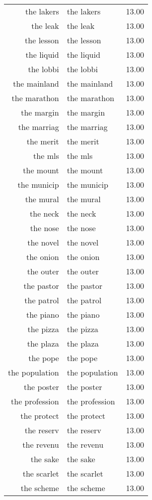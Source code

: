 \begin{table}[ht]
\begin{tabular}{rlr}
  the lakers & the lakers & 13.00 \\ 
  the leak & the leak & 13.00 \\ 
  the lesson & the lesson & 13.00 \\ 
  the liquid & the liquid & 13.00 \\ 
  the lobbi & the lobbi & 13.00 \\ 
  the mainland & the mainland & 13.00 \\ 
  the marathon & the marathon & 13.00 \\ 
  the margin & the margin & 13.00 \\ 
  the marriag & the marriag & 13.00 \\ 
  the merit & the merit & 13.00 \\ 
  the mls & the mls & 13.00 \\ 
  the mount & the mount & 13.00 \\ 
  the municip & the municip & 13.00 \\ 
  the mural & the mural & 13.00 \\ 
  the neck & the neck & 13.00 \\ 
  the nose & the nose & 13.00 \\ 
  the novel & the novel & 13.00 \\ 
  the onion & the onion & 13.00 \\ 
  the outer & the outer & 13.00 \\ 
  the pastor & the pastor & 13.00 \\ 
  the patrol & the patrol & 13.00 \\ 
  the piano & the piano & 13.00 \\ 
  the pizza & the pizza & 13.00 \\ 
  the plaza & the plaza & 13.00 \\ 
  the pope & the pope & 13.00 \\ 
  the population & the population & 13.00 \\ 
  the poster & the poster & 13.00 \\ 
  the profession & the profession & 13.00 \\ 
  the protect & the protect & 13.00 \\ 
  the reserv & the reserv & 13.00 \\ 
  the revenu & the revenu & 13.00 \\ 
  the sake & the sake & 13.00 \\ 
  the scarlet & the scarlet & 13.00 \\ 
  the scheme & the scheme & 13.00 \\ 

\end{tabular}
\end{table}

